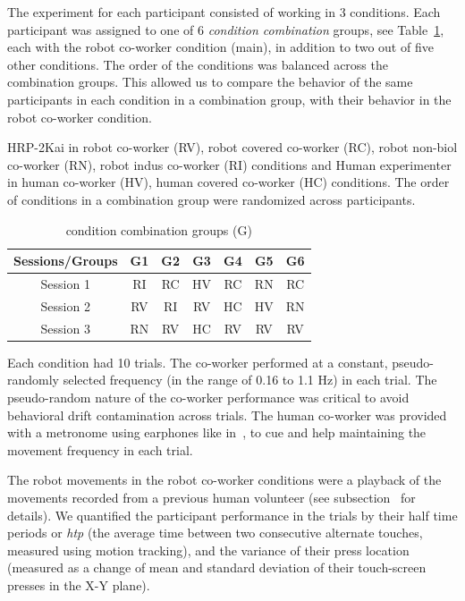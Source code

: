 \documentclass[a4paper, 12pt, oneside]{Thesis}  %
\begin{document}
The experiment for each participant consisted of working in 3 conditions. Each participant was assigned to one of 6 \emph{condition combination} groups, see Table~\ref{groupTable}, each with the robot co-worker condition (main), in addition to two out of five other conditions. The order of the conditions was balanced across the combination groups. This allowed us to compare the behavior of the same participants in each condition in a combination group, with their behavior in the robot co-worker condition.


\begin{table}[hpt]
	\caption{condition combination groups (G)}
	{HRP-2Kai in robot co-worker (RV), robot covered co-worker (RC), robot non-biol co-worker (RN), robot indus co-worker (RI) conditions and Human experimenter in human co-worker (HV), human covered co-worker (HC) conditions. The order of conditions in a combination group were randomized across participants.}
	\label{groupTable}
	\begin{center}
		\begin{tabular}{|c cccccc|}
			\hline  
			{\bf Sessions/Groups} &  {\bf G1} &  {\bf G2} &  {\bf G3} &  {\bf G4} &  {\bf G5} &  {\bf G6}  \\ 
			\hline
			Session 1 & RI & RC & HV & RC & RN &  RC \\ 
			
			Session 2 & RV & RI & RV & HC & HV &  RN \\ 
			
			Session 3 & RN & RV & HC & RV & RV &  RV \\ 
			\hline 			
		\end{tabular} 
	\end{center}
\end{table}


Each condition had 10 trials. The co-worker performed at a constant, pseudo-randomly selected frequency (in the range of 0.16 to 1.1 Hz) in each trial. The pseudo-random nature of the co-worker performance was critical to avoid behavioral drift contamination across trials. The human co-worker was provided with a metronome using earphones like in~\cite{Bisio:PlosOne:2014}, to cue and help maintaining the movement frequency in each trial.

The robot movements in the robot co-worker conditions were a playback of the movements recorded from a previous human volunteer (see subsection~ for details). We quantified the participant performance in the trials by their half time periods or {\it htp} (the average time between two consecutive alternate touches, measured using motion tracking), and the variance of their press location (measured as a change of mean and standard deviation of their touch-screen presses in the X-Y plane).
\end{document}
